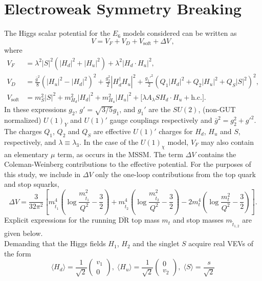 \documentclass[preprint,amsmath,amssymb,aps,superscriptaddress,prd,showpacs,floatfix,nofootinbib]{revtex4-1}
\begin{document}
\section{\label{sec:ewsb}Electroweak Symmetry Breaking}
The Higgs scalar potential for the $E_6$ models considered can be written as \cite{King:2005jy} 
\begin{equation}\label{eq:E6VeffOneLoop}
V=V_F+V_D+V_{\textrm{soft}}+\Delta V \, ,
\end{equation}
where
\begin{align}
V_F&=\lambda^2|S|^2(|H_d|^2+|H_u|^2)+\lambda^2|H_d\cdot
H_u|^2,\label{eq:E6VFterms}\\ 
V_D&=\frac{\bar{g}^2}{8}\left (
|H_u|^2-|H_d|^2\right )^2+\frac{g_2^2}{2}|H_d^\dagger
H_u|^2+\frac{g_1'^2}{2}(Q_1|H_d|^2+Q_2|H_u|^2+Q_S|S|^2)^2,\label{eq:E6VDterms}\\ 
V_{\textrm{soft}}&=m_S^2|S|^2+m_{H_d}^2|H_d|^2+m_{H_u}^2|H_u|^2+\Big
[\lambda A_\lambda SH_d\cdot H_u+\textrm{h.c.}\Big
].\label{eq:E6Vsoft}
\end{align}
In these expressions $g_2$, $g'=\sqrt{3/5}g_1$, and $g_1'$ are the
$SU(2)$, (non-GUT normalized) $U(1)_Y$ and $U(1)'$ gauge couplings
respectively and $\bar{g}^2=g_2^2+g'^2$. The charges $Q_1$,
$Q_2$ and $Q_S$ are effective $U(1)'$ charges for
$H_d$, $H_u$ and $S$, respectively, and $\lambda\equiv \lambda_3$. In the case
of the $U(1)_\chi$ model, $V_F$ may also contain an elementary
$\mu$ term, as occurs in the MSSM. The term $\Delta V$ contains the
Coleman-Weinberg contributions to the effective potential. For the purposes of this study, 
we include in $\Delta V$ only the one-loop contributions from the top quark and stop squarks,
\begin{equation}
\Delta V=\frac{3}{32\pi^2}\left [ m_{\tilde{t}_1}^4\left ( \log\frac{m_{\tilde{t}_1}^2}{Q^2}-\frac{3}{2}\right )+m_{\tilde{t}_2}^4\left ( \log\frac{m_{\tilde{t}_2}^2}{Q^2}-\frac{3}{2}\right )-2m_t^4\left ( \log\frac{m_t^2}{Q^2}-\frac{3}{2}\right )\right ].
\end{equation}
Explicit expressions for the running $\overline{\textrm{DR}}$ top mass $m_t$ and stop masses $m_{\tilde{t}_{1,2}}$ are given 
below.\\
Demanding that the Higgs fields $H_1$, $H_2$ and the singlet $S$ acquire real VEVs of the form
\begin{equation}\label{eq:E6vevs}
\langle H_d \rangle = \frac{1}{\sqrt{2}}\begin{pmatrix} v_1 \\ 0\end{pmatrix}, \; \langle H_u \rangle = \frac{1}{\sqrt{2}}\begin{pmatrix} 0 \\ v_2 \end{pmatrix}, \; \langle S \rangle =\frac{s}{\sqrt{2}}
\end{equation}
\end{document}

